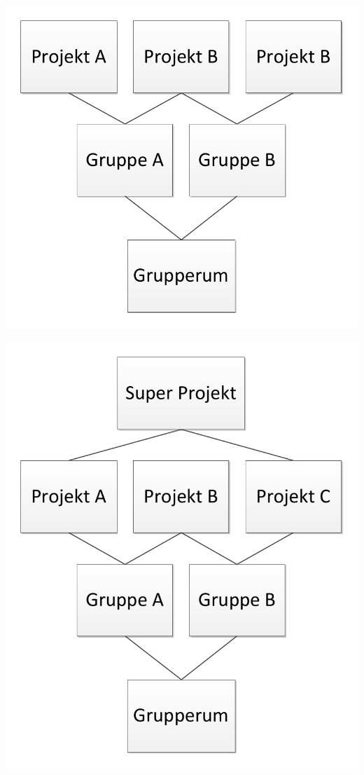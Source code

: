 \begin{frame}{\topictwo} 
\includegraphics[width=\columnwidth]{input/rasmus/topictwo4.pdf}
\end{frame}
\begin{frame}{\topictwo} 
\includegraphics[width=\columnwidth]{input/rasmus/topictwo5.pdf}
\end{frame}
